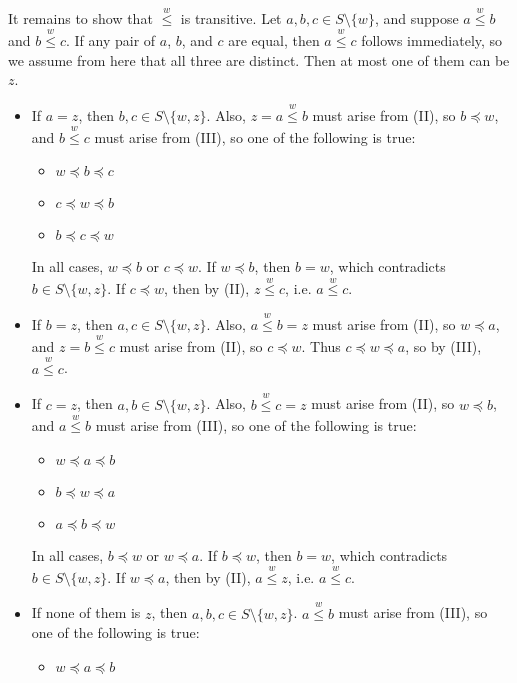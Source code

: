 \documentclass{article}
\newcommand{\po}[1]{\overset{#1}{\leq}}
\begin{document}
\begin{enumerate}[label=(\roman*)]
  It remains to show that $\po{w}$ is transitive.
  Let $a, b, c \in S \setminus \{w\}$,
  and suppose $a \po{w} b$ and $b \po{w} c$.
  If any pair of $a$, $b$, and $c$ are equal,
  then $a \po{w} c$ follows immediately,
  so we assume from here that all three are distinct.
  Then at most one of them can be $z$.
  \begin{itemize}
  \item
    If $a = z$, then $b, c \in S \setminus \{w, z\}$.
    Also, $z = a \po{w} b$ must arise from (II),
    so $b \preceq w$,
    and $b \po{w} c$ must arise from (III),
    so one of the following is true:
    \begin{itemize}
    \item $w \preceq b \preceq c$
    \item $c \preceq w \preceq b$
    \item $b \preceq c \preceq w$
    \end{itemize}
    In all cases, $w \preceq b$ or $c \preceq w$.
    If $w \preceq b$, then $b = w$,
    which contradicts $b \in S \setminus \{w, z\}$.
    If $c \preceq w$, then by (II), $z \po{w} c$,
    i.e. $a \po{w} c$.
  \item
    If $b = z$, then $a, c \in S \setminus \{w, z\}$.
    Also, $a \po{w} b = z$ must arise from (II),
    so $w \preceq a$,
    and $z = b \po{w} c$ must arise from (II),
    so $c \preceq w$.
    Thus $c \preceq w \preceq a$,
    so by (III), $a \po{w} c$.
  \item
    If $c = z$, then $a, b \in S \setminus \{w, z\}$.
    Also, $b \po{w} c = z$ must arise from (II),
    so $w \preceq b$,
    and $a \po{w} b$ must arise from (III),
    so one of the following is true:
    \begin{itemize}
    \item $w \preceq a \preceq b$
    \item $b \preceq w \preceq a$
    \item $a \preceq b \preceq w$
    \end{itemize}
    In all cases, $b \preceq w$ or $w \preceq a$.
    If $b \preceq w$, then $b = w$,
    which contradicts $b \in S \setminus \{w, z\}$.
    If $w \preceq a$, then by (II), $a \po{w} z$,
    i.e. $a \po{w} c$.
  \item
    If none of them is $z$, then $a, b, c \in S \setminus \{w, z\}$.
    $a \po{w} b$ must arise from (III),
    so one of the following is true:
    \begin{itemize}
    \item $w \preceq a \preceq b$

\end{itemize}
\end{itemize}
\end{enumerate}
\end{document}
